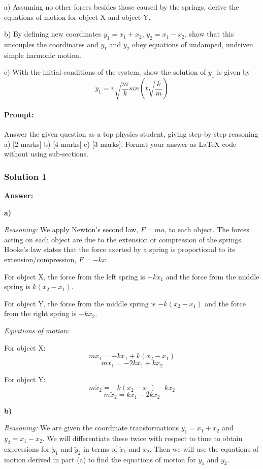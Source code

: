 \documentclass{article}
\begin{document}
a) Assuming no other forces besides those caused by the springs, derive the equations of motion
for object X and object Y.

b) By defining new coordinates $y_1 = x_1 + x_2$, $y_2 = x_1 - x_2$, show that this uncouples the coordinates
and $y_1$ and $y_2$ obey equations of undamped, undriven simple harmonic motion.

c) With the initial conditions of the system, show the solution of $y_1$ is given by \[y_{1}=v\sqrt{\frac{m}{k}}sin(t\sqrt{\frac{k}{m}})\]

\paragraph{Prompt: \\} 
Answer the given question as a top physics student, giving step-by-step reasoning a) [2 marks] b) [4 marks] c) [3 marks]. Format your answer as LaTeX code without using sub-sections.

\subsubsection{Solution 1}

\textbf{Answer:}

\textbf{a)}

\textit{Reasoning:}
We apply Newton's second law, $F=ma$, to each object. The forces acting on each object are due to the extension or compression of the springs. Hooke's law states that the force exerted by a spring is proportional to its extension/compression, $F=-kx$.

For object X, the force from the left spring is $-kx_1$ and the force from the middle spring is $k(x_2 - x_1)$.

For object Y, the force from the middle spring is $-k(x_2 - x_1)$ and the force from the right spring is $-kx_2$.

\textit{Equations of motion:}

For object X:
\[ m\ddot{x}_1 = -kx_1 + k(x_2 - x_1) \]
\[ m\ddot{x}_1 = -2kx_1 + kx_2 \]

For object Y:
\[ m\ddot{x}_2 = -k(x_2 - x_1) - kx_2 \]
\[ m\ddot{x}_2 = kx_1 - 2kx_2 \]

\textbf{b)}

\textit{Reasoning:}
We are given the coordinate transformations $y_1 = x_1 + x_2$ and $y_2 = x_1 - x_2$. We will differentiate these twice with respect to time to obtain expressions for $\ddot{y}_1$ and $\ddot{y}_2$ in terms of $\ddot{x}_1$ and $\ddot{x}_2$. Then we will use the equations of motion derived in part (a) to find the equations of motion for $y_1$ and $y_2$.
\end{document}
